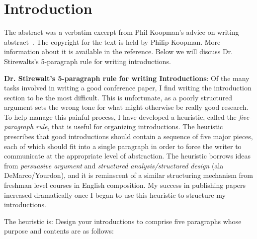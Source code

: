 
\section{Introduction}

The abstract was a verbatim excerpt from Phil Koopman's advice 
on writing abstract~\cite{koopman97a}. The copyright for the 
text is held by Philip Koopman. More information about it is 
available in the reference. Below we will discuss Dr. Stirewalts's
5-paragraph rule for writing introductions. 

{\bf Dr. Stirewalt's 5-paragraph rule for writing Introductions}: 
Of the many tasks involved in writing a good conference
paper, I find writing the introduction section to be
the most difficult. This is unfortunate, as a poorly
structured argument sets the wrong tone for what might
otherwise be really good research. To help manage this
painful process, I have developed a heuristic, called the
{\em five-paragraph rule}, that is useful for organizing
introductions. The heuristic prescribes that good
introductions should contain a sequence of five major
pieces, each of which should fit into a single paragraph
in order to force the writer to communicate at the
appropriate level of abstraction. The heuristic borrows
ideas from {\em persuasive argument} and
{\em structured analysis/structured design} (ala DeMarco/Yourdon),
and it is reminscent of a similar structuring mechanism
from freshman level courses in English composition.
My success in publishing papers increased dramatically
once I began to use this heuristic to structure my
introductions.

The heuristic is: Design your introductions to comprise five paragraphs
whose purpose and contents are as follows:

